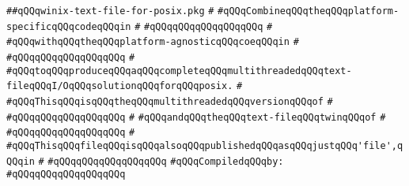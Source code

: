 \label{src/lib/std/src/posix/winix-text-file-for-posix.pkg}
\verb|##qQQqwinix-text-file-for-posix.pkg|\newline
\verb|#|\newline
\verb|#qQQqCombineqQQqtheqQQqplatform-specificqQQqcodeqQQqin|\newline
\verb|#|\newline
\verb|#qQQqqQQqqQQqqQQqqQQq|\newline
\verb|#|\newline
\verb|#qQQqwithqQQqtheqQQqplatform-agnosticqQQqcoeqQQqin|\newline
\verb|#|\newline
\verb|#qQQqqQQqqQQqqQQqqQQq|\newline
\verb|#|\newline
\verb|#qQQqtoqQQqproduceqQQqaqQQqcompleteqQQqmultithreadedqQQqtext-fileqQQqI/OqQQqsolutionqQQqforqQQqposix.|\newline
\verb|#|\newline
\verb|#qQQqThisqQQqisqQQqtheqQQqmultithreadedqQQqversionqQQqof|\newline
\verb|#|\newline
\verb|#qQQqqQQqqQQqqQQqqQQq|\newline
\verb|#|\newline
\verb|#qQQqandqQQqtheqQQqtext-fileqQQqtwinqQQqof|\newline
\verb|#|\newline
\verb|#qQQqqQQqqQQqqQQqqQQq|\newline
\verb|#|\newline
\verb|#qQQqThisqQQqfileqQQqisqQQqalsoqQQqpublishedqQQqasqQQqjustqQQq'file',qQQqin|\newline
\verb|#|\newline
\verb|#qQQqqQQqqQQqqQQqqQQq|\newline
\newline
\verb|#qQQqCompiledqQQqby:|\newline
\verb|#qQQqqQQqqQQqqQQqqQQq|\newline
